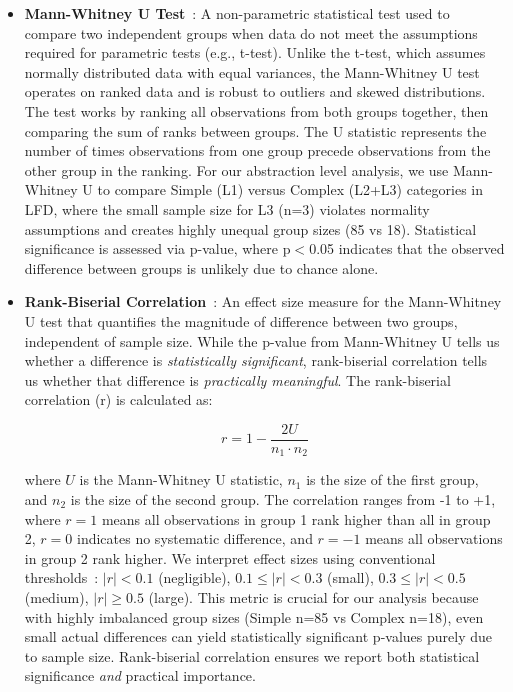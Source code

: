 \documentclass[lettersize,journal]{IEEEtran}
\begin{document}
\begin{itemize}
        \item \textbf{Mann-Whitney U Test}~\cite{mann1947test}: A non-parametric statistical test used to compare two independent groups when data do not meet the assumptions required for parametric tests (e.g., t-test). Unlike the t-test, which assumes normally distributed data with equal variances, the Mann-Whitney U test operates on ranked data and is robust to outliers and skewed distributions. The test works by ranking all observations from both groups together, then comparing the sum of ranks between groups. The U statistic represents the number of times observations from one group precede observations from the other group in the ranking. For our abstraction level analysis, we use Mann-Whitney U to compare Simple (L1) versus Complex (L2+L3) categories in LFD, where the small sample size for L3 (n=3) violates normality assumptions and creates highly unequal group sizes (85 vs 18). Statistical significance is assessed via p-value, where p$<$0.05 indicates that the observed difference between groups is unlikely due to chance alone.

        \item \textbf{Rank-Biserial Correlation}~\cite{kerby2014simple}: An effect size measure for the Mann-Whitney U test that quantifies the magnitude of difference between two groups, independent of sample size. While the p-value from Mann-Whitney U tells us whether a difference is \textit{statistically significant}, rank-biserial correlation tells us whether that difference is \textit{practically meaningful}. The rank-biserial correlation (r) is calculated as:
        
        \begin{equation}
            r = 1 - \frac{2U}{n_1 \cdot n_2}
        \end{equation}
        
        where $U$ is the Mann-Whitney U statistic, $n_1$ is the size of the first group, and $n_2$ is the size of the second group. The correlation ranges from -1 to +1, where $r = 1$ means all observations in group 1 rank higher than all in group 2, $r = 0$ indicates no systematic difference, and $r = -1$ means all observations in group 2 rank higher. We interpret effect sizes using conventional thresholds~\cite{cohen1988statistical}: $|r| < 0.1$ (negligible), $0.1 \leq |r| < 0.3$ (small), $0.3 \leq |r| < 0.5$ (medium), $|r| \geq 0.5$ (large). This metric is crucial for our analysis because with highly imbalanced group sizes (Simple n=85 vs Complex n=18), even small actual differences can yield statistically significant p-values purely due to sample size. Rank-biserial correlation ensures we report both statistical significance \textit{and} practical importance.
    
\end{itemize}
\end{document}
